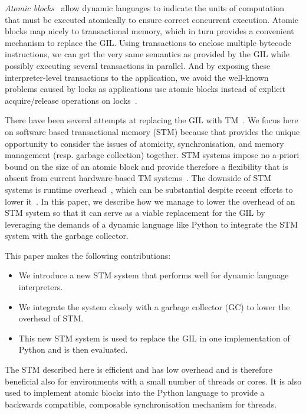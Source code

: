 \documentclass{sigplanconf}
\begin{document}
\emph{Atomic blocks}~\cite{tim03,tim05} allow dynamic languages to
indicate the units of computation that must be executed atomically to
ensure correct concurrent execution.  Atomic blocks map nicely to
transactional memory, which in turn provides a convenient mechanism to replace
the GIL.  Using transactions to enclose multiple bytecode
instructions, we can get the very same semantics as provided by the
GIL while possibly executing several transactions in parallel. And by
exposing these interpreter-level transactions to the application, we
avoid the well-known problems caused by locks as applications use
atomic blocks instead of explicit acquire/release operations on
locks~\cite{christopher10,victor11,shan08}.

There have been several attempts at replacing the GIL with
TM~\cite{nicholas06,odaira14,fuad10}.  We focus here on software based
transactional memory (STM) because that provides the unique
opportunity to consider the issues of atomicity, synchronisation, and
memory management (resp. garbage collection) together.  STM systems
impose no a-priori bound on the size of an atomic block and provide
therefore a flexibility that is absent from current hardware-based TM
systems~\cite{wayforward14}.  The downside of STM systems is runtime
overhead~\cite{cascaval08,drago11}, which can be substantial despite
recent efforts to lower it~\cite{warmhoff13,spear09}.  In
this paper, we describe how we manage to lower the overhead of an STM
system so that it can serve as a viable replacement for the GIL by
leveraging the demands of a dynamic language like Python to integrate
the STM system with the garbage collector.


This paper makes the following contributions:
\begin{itemize}[noitemsep]
\item We introduce a new STM system that performs well for dynamic
  language interpreters.
\item We integrate the system closely with a garbage collector
  (GC) to lower the overhead of STM.
\item This new STM system is used to replace the GIL in one
  implementation of Python and is then evaluated.
\end{itemize}
The STM described here is efficient and has low overhead and is
therefore beneficial also for environments with a small number of
threads or cores. It is also used to implement atomic blocks into the
Python language to provide a backwards compatible, composable
synchronisation mechanism for threads.
\end{document}
